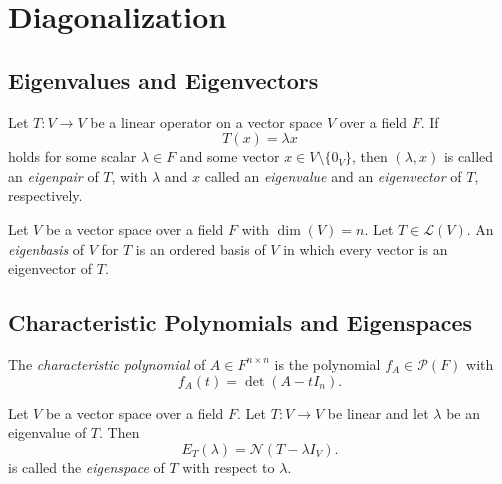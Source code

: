 \chapter{Diagonalization}
\section{Eigenvalues and Eigenvectors}
\begin{definition}
  Let $T: V \to V$ be a linear operator on a vector space $V$ over a field $F$.
  If
  \begin{equation*}
    T(x) = \lambda x
  \end{equation*}
  holds for some scalar $\lambda \in F$ and some vector
  $x \in V \setminus \{0_V\}$, then $(\lambda, x)$ is called an
  \emph{eigenpair} of $T$, with $\lambda$ and $x$ called an
  \emph{eigenvalue} and an \emph{eigenvector} of $T$, respectively.
\end{definition}

\begin{definition}
  Let $V$ be a vector space over a field $F$ with $\dim(V) = n$.
  Let $T \in \mathcal{L}(V)$.
  An \emph{eigenbasis} of $V$ for $T$ is an ordered basis of $V$ in which every
  vector is an eigenvector of $T$.
\end{definition}

\section{Characteristic Polynomials and Eigenspaces}
\begin{definition}
  The \emph{characteristic polynomial} of $A \in F^{n \times n}$ is the
  polynomial $f_A \in \mathcal{P}(F)$ with
  \begin{equation*}
    f_A(t) = \det(A - tI_n).
  \end{equation*}
\end{definition}

\begin{definition}
  Let $V$ be a vector space over a field $F$.
  Let $T: V \to V$ be linear and let $\lambda$ be an eigenvalue of $T$.
  Then
  \begin{equation*}
    E_T(\lambda) = \mathcal{N}(T - \lambda I_V).
  \end{equation*}
  is called the \emph{eigenspace} of $T$ with respect to $\lambda$.
\end{definition}